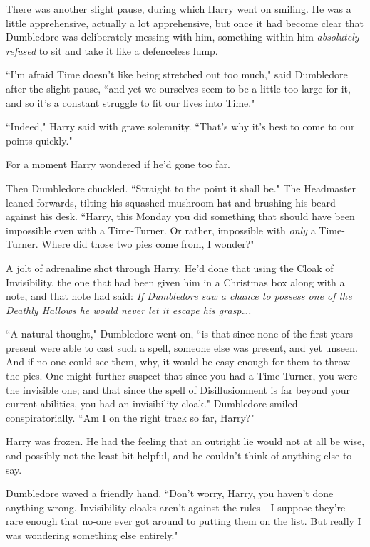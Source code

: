 There was another slight pause, during which Harry went on smiling. He was a little apprehensive, actually a lot apprehensive, but once it had become clear that Dumbledore was deliberately messing with him, something within him \emph{absolutely refused} to sit and take it like a defenceless lump.

``I'm afraid Time doesn't like being stretched out too much," said Dumbledore after the slight pause, ``and yet we ourselves seem to be a little too large for it, and so it's a constant struggle to fit our lives into Time."

``Indeed," Harry said with grave solemnity. ``That's why it's best to come to our points quickly."

For a moment Harry wondered if he'd gone too far.

Then Dumbledore chuckled. ``Straight to the point it shall be." The Headmaster leaned forwards, tilting his squashed mushroom hat and brushing his beard against his desk. ``Harry, this Monday you did something that should have been impossible even with a Time-Turner. Or rather, impossible with \emph{only} a Time-Turner. Where did those two pies come from, I wonder?"

A jolt of adrenaline shot through Harry. He'd done that using the Cloak of Invisibility, the one that had been given him in a Christmas box along with a note, and that note had said: \emph{If Dumbledore saw a chance to possess one of the Deathly Hallows he would never let it escape his grasp{\ldots}.}

``A natural thought," Dumbledore went on, ``is that since none of the first-years present were able to cast such a spell, someone else was present, and yet unseen. And if no-one could see them, why, it would be easy enough for them to throw the pies. One might further suspect that since you had a Time-Turner, you were the invisible one; and that since the spell of Disillusionment is far beyond your current abilities, you had an invisibility cloak." Dumbledore smiled conspiratorially. ``Am I on the right track so far, Harry?"

Harry was frozen. He had the feeling that an outright lie would not at all be wise, and possibly not the least bit helpful, and he couldn't think of anything else to say.

Dumbledore waved a friendly hand. ``Don't worry, Harry, you haven't done anything wrong. Invisibility cloaks aren't against the rules—I suppose they're rare enough that no-one ever got around to putting them on the list. But really I was wondering something else entirely."

